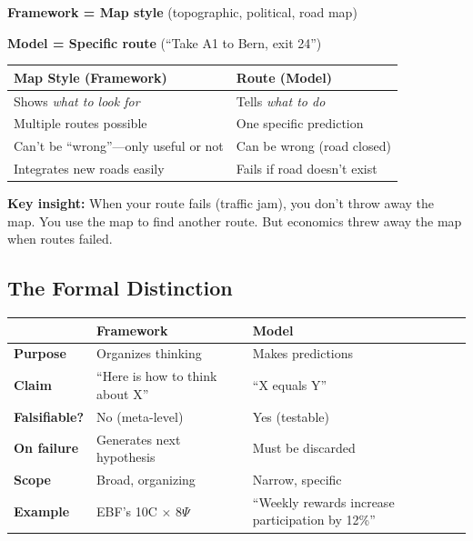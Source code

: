 \begin{tcolorbox}[colback=green!5!white, colframe=green!75!black,
    title=\textbf{The Map Analogy}]

\textbf{Framework = Map style} (topographic, political, road map)

\textbf{Model = Specific route} (``Take A1 to Bern, exit 24'')

\vspace{0.5em}
\begin{tabular}{@{}p{6cm}p{6cm}@{}}
\textbf{Map Style (Framework)} & \textbf{Route (Model)} \\
\midrule
Shows \textit{what to look for} & Tells \textit{what to do} \\
Multiple routes possible & One specific prediction \\
Can't be ``wrong''---only useful or not & Can be wrong (road closed) \\
Integrates new roads easily & Fails if road doesn't exist \\
\end{tabular}

\vspace{0.5em}
\textbf{Key insight:} When your route fails (traffic jam), you don't throw away the map.
You use the map to find another route. But economics threw away the map when routes failed.

\end{tcolorbox}

\subsection{The Formal Distinction}

\begin{center}
\renewcommand{\arraystretch}{1.4}
\begin{tabular}{@{}p{3cm}p{5.5cm}p{5.5cm}@{}}
\toprule
& \textbf{Framework} & \textbf{Model} \\
\midrule
\textbf{Purpose} & Organizes thinking & Makes predictions \\
\textbf{Claim} & ``Here is how to think about X'' & ``X equals Y'' \\
\textbf{Falsifiable?} & No (meta-level) & Yes (testable) \\
\textbf{On failure} & Generates next hypothesis & Must be discarded \\
\textbf{Scope} & Broad, organizing & Narrow, specific \\
\textbf{Example} & EBF's 10C $\times$ 8$\Psi$ & ``Weekly rewards increase participation by 12\%'' \\
\bottomrule
\end{tabular}
\end{center}


